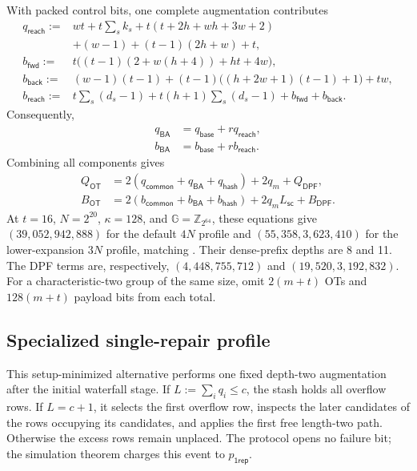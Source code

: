 With packed control bits, one complete augmentation contributes
\begin{align}
 q_{\mathsf{reach}}
  :={}&wt+t\sum_sk_s+t(t+2h+wh+3w+2)\nonumber\\
     &+(w-1)+(t-1)(2h+w)+t,
 \label{eq:waterfall-reachability-augmentation-ot-count}\\
 b_{\mathsf{fwd}}
  :={}&t\bigl((t-1)(2+w(h+4))+ht+4w\bigr),\nonumber\\
 b_{\mathsf{back}}
  :={}&(w-1)(t-1)
     +(t-1)\bigl((h+2w+1)(t-1)+1\bigr)+tw,\nonumber\\
 b_{\mathsf{reach}}
  :={}&t\sum_s(d_s-1)+t(h+1)\sum_s(d_s-1)
     +b_{\mathsf{fwd}}+b_{\mathsf{back}}.
 \label{eq:waterfall-reachability-augmentation-cost}
\end{align}
Consequently,
\begin{align}
 q_{\mathsf{BA}}&=q_{\mathsf{base}}+rq_{\mathsf{reach}},
 \label{eq:waterfall-reachability-ot-count}\\
 b_{\mathsf{BA}}&=b_{\mathsf{base}}+rb_{\mathsf{reach}}.
 \label{eq:waterfall-reachability-ot-bits}
\end{align}
Combining all components gives
\begin{align}
 Q_{\mathsf{OT}}
  &=2(q_{\mathsf{common}}+q_{\mathsf{BA}}+q_{\mathsf{hash}})
    +2q_m+Q_{\mathsf{DPF}},
    \label{eq:waterfall-total-ot-count}\\
 B_{\mathsf{OT}}
  &=2(b_{\mathsf{common}}+b_{\mathsf{BA}}+b_{\mathsf{hash}})
    +2q_mL_{\mathsf{sc}}+B_{\mathsf{DPF}}.
    \label{eq:waterfall-total-ot-bits}
\end{align}
At $t=16$, $N=2^{20}$, $\kappa=128$, and $\mathbb G=\mathbb Z_{2^{64}}$,
these equations give
$(39{,}052,942{,}888)$ for the default $4N$ profile and
$(55{,}358,3{,}623{,}410)$ for the lower-expansion $3N$ profile, matching
.
Their dense-prefix depths are 8 and 11. The DPF terms are, respectively,
$(4{,}448,755{,}712)$ and $(19{,}520,3{,}192{,}832)$.
For a characteristic-two group of the same size, omit $2(m+t)$ OTs and
$128(m+t)$ payload bits from each total.

\subsection{Specialized single-repair profile}
\label{app:waterfallOneRepair}

This setup-minimized alternative performs one fixed depth-two augmentation
after the initial waterfall stage.  If $L:=\sum_iq_i\leq c$, the stash holds
all overflow rows.  If $L=c+1$, it selects the first overflow row, inspects the
later candidates of the rows occupying its candidates, and applies the first
free length-two path.  Otherwise the excess rows remain unplaced.  The
protocol opens no failure bit; the simulation theorem charges this event to
$p_{\mathsf{1rep}}$.

